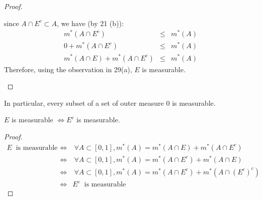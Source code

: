 \begin{pblm}
\begin{proof}
\begin{enumerate}[(a)]
	since $A \cap E^c \subset A$, we have (by 21 (b)): 
	\begin{equation*}
		\begin{array}{rcl}
		m^\ast(A\cap E^c) & \le & m^\ast (A)\\
		0 + m^\ast(A\cap E^c) & \le & m^\ast (A)\\
		m^\ast(A \cap E) + m^\ast(A\cap E^c) & \le & m^\ast (A)
		\end{array}
	\end{equation*}
	Therefore, using the observation in 29(a), $E$ is measurable. 
\end{enumerate}
\end{proof}
\end{pblm}

\begin{rmk}%
	In particular, every subset of a set of outer measure 0 is measurable. 
\end{rmk}

\begin{pblm}%
	$E$ is measurable $\Leftrightarrow E^c$ is measurable. 
\begin{proof}
\begin{equation*}
	\begin{array}{rcl}
	E ~\text{ is measurable }~ & \Leftrightarrow & ~ \forall A \subset [0,1], m^\ast(A) = m^\ast(A \cap E) + m^\ast(A \cap E^c)\\
				& \Leftrightarrow & ~ \forall A \subset [0,1], m^\ast(A) = m^\ast(A \cap E^c) + m^\ast(A \cap E)\\
				& \Leftrightarrow & ~ \forall A \subset [0,1], m^\ast(A) = m^\ast(A \cap E^c) + m^\ast(A \cap (E^c)^c)\\
				& \Leftrightarrow & E^c ~\text{ is measurable}
	\end{array}
\end{equation*}
\end{proof}
\end{pblm}

